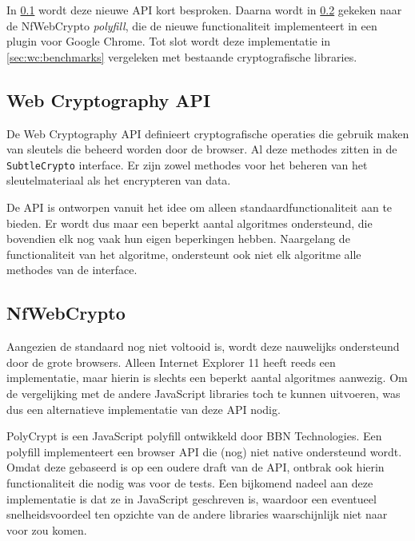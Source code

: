 \npar In \ref{sec:wc:web_cryptography_api} wordt deze nieuwe API kort besproken. Daarna wordt in \ref{sec:wc:nfwebcrypto} gekeken naar de NfWebCrypto \textit{polyfill}, die de nieuwe functionaliteit implementeert in een plugin voor Google Chrome. Tot slot wordt deze implementatie in \ref{sec:wc:benchmarks} vergeleken met bestaande cryptografische libraries.

\subsection[Web Cryptography API]{Web Cryptography API~\cite{sleevi_watson_web_cryptography_api}}
\label{sec:wc:web_cryptography_api}

De Web Cryptography API definieert cryptografische operaties die gebruik maken van sleutels die beheerd worden door de browser. Al deze methodes zitten in de \texttt{SubtleCrypto} interface. Er zijn zowel methodes voor het beheren van het sleutelmateriaal als het encrypteren van data.

\npar De API is ontworpen vanuit het idee om alleen standaardfunctionaliteit aan te bieden. Er wordt dus maar een beperkt aantal algoritmes ondersteund, die bovendien elk nog vaak hun eigen beperkingen hebben.\cite{mail:sleevi_algorithms_and_referenced_documents} Naargelang de functionaliteit van het algoritme, ondersteunt ook niet elk algoritme alle methodes van de interface.

\subsection{NfWebCrypto}
\label{sec:wc:nfwebcrypto}

Aangezien de standaard nog niet voltooid is, wordt deze nauwelijks ondersteund door de grote browsers.\cite{site:html5test_web_cryptography_api} Alleen Internet Explorer 11 heeft reeds een implementatie, maar hierin is slechts een beperkt aantal algoritmes aanwezig.\cite{site:microsoft_web_cryptography} Om de vergelijking met de andere JavaScript libraries toch te kunnen uitvoeren, was dus een alternatieve implementatie van deze API nodig.

\npar PolyCrypt is een JavaScript polyfill ontwikkeld door BBN Technologies.\cite{site:polycrypt} Een polyfill implementeert een browser API die (nog) niet native ondersteund wordt. Omdat deze gebaseerd is op een oudere draft van de API, ontbrak ook hierin functionaliteit die nodig was voor de tests. Een bijkomend nadeel aan deze implementatie is dat ze in JavaScript geschreven is, waardoor een eventueel snelheidsvoordeel ten opzichte van de andere libraries waarschijnlijk niet naar voor zou komen.

